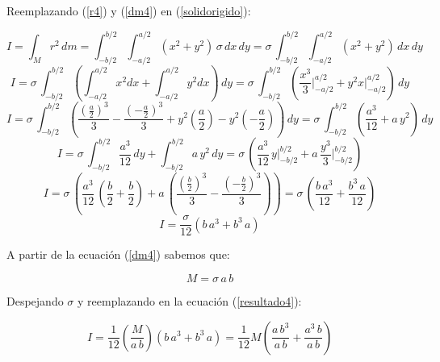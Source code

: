 \documentclass[letter,oneside,11pt]{article}
\begin{document}
Reemplazando (\ref{r4}) y (\ref{dm4}) en (\ref{solidorigido}):

\begin{equation*}
    I = \int_{M} r^2\, dm = \int_{-b/2}^{b/2} \int_{-a/2}^{a/2} (x^2 + y^2)\, \sigma\, dx\, dy = \sigma\, \int_{-b/2}^{b/2} \int_{-a/2}^{a/2} (x^2 + y^2)\, dx \, dy
\end{equation*}
\begin{equation*}
    I = \sigma\, \int_{-b/2}^{b/2} \left( \int_{-a/2}^{a/2} x^2 dx + \int_{-a/2}^{a/2} y^2 dx \right) \, dy = \sigma\, \int_{-b/2}^{b/2} \left( \frac{x^3}{3} \Biggr|_{-a/2}^{a/2} + y^2 x \Biggr|_{-a/2}^{a/2} \right) \, dy
\end{equation*}
\begin{equation*}
    I = \sigma\, \int_{-b/2}^{b/2} \left( \frac{(\frac{a}{2})^3}{3} - \frac{(-\frac{a}{2})^3}{3} + y^2 \left( \frac{a}{2}\right) - y^2 \left( -\frac{a}{2}\right) \right) \, dy = \sigma\, \int_{-b/2}^{b/2} \left( \frac{a^3}{12} + a\, y^2  \right) \, dy
\end{equation*}
\begin{equation*}
    I = \sigma\, \int_{-b/2}^{b/2} \frac{a^3}{12}\, dy + \int_{-b/2}^{b/2} a\, y^2\, dy = \sigma\, \left( \frac{a^3}{12}\, y \Biggr|_{-b/2}^{b/2} + a\, \frac{y^3}{3} \Biggr|_{-b/2}^{b/2} \right)
\end{equation*}
\begin{equation*}
    I = \sigma\, \left( \frac{a^3}{12}\, \left( \frac{b}{2} + \frac{b}{2} \right) + a\, \left( \frac{(\frac{b}{2})^3}{3} - \frac{(-\frac{b}{2})^3}{3} \right) \right) = \sigma\, \left( \frac{b\, a^3}{12} + \frac{b^3\, a}{12} \right)
\end{equation*}
\begin{equation}
    I = \frac{\sigma}{12} (b\, a^3 + b^3\, a)
\label{resultado4}
\end{equation}

A partir de la ecuación (\ref{dm4}) sabemos que:

\begin{equation*}
    M = \sigma\, a\, b
\end{equation*}

Despejando $\sigma$ y reemplazando en la ecuación (\ref{resultado4}):

\begin{equation*}
    I = \frac{1}{12} \left( \frac{M}{a\, b} \right) (b\, a^3 + b^3\, a) = \frac{1}{12} M \left( \frac{a\, b^3}{a\, b} + \frac{a^3\, b}{a\, b} \right)
\end{equation*}
\end{document}

